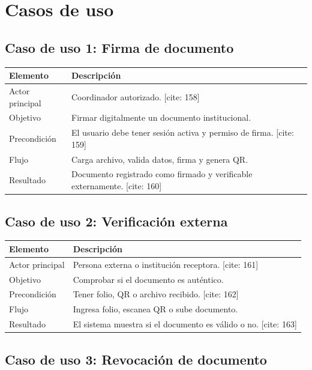\documentclass[10pt]{article} [cite: 1]
\begin{document}
\section{Casos de uso}

\subsection{Caso de uso 1: Firma de documento}

\begin{longtable}{p{4cm}p{10cm}}
\toprule
\textbf{Elemento} & \textbf{Descripción} \\
\midrule
Actor principal & Coordinador autorizado. [cite: 158] \\
Objetivo & Firmar digitalmente un documento institucional. \\
Precondición & El usuario debe tener sesión activa y permiso de firma. [cite: 159] \\
Flujo & Carga archivo, valida datos, firma y genera QR. \\
Resultado & Documento registrado como firmado y verificable externamente. [cite: 160] \\
\bottomrule
\end{longtable}

\subsection{Caso de uso 2: Verificación externa}

\begin{longtable}{p{4cm}p{10cm}}
\toprule
\textbf{Elemento} & \textbf{Descripción} \\
\midrule
Actor principal & Persona externa o institución receptora. [cite: 161] \\
Objetivo & Comprobar si el documento es auténtico. \\
Precondición & Tener folio, QR o archivo recibido. [cite: 162] \\
Flujo & Ingresa folio, escanea QR o sube documento. \\
Resultado & El sistema muestra si el documento es válido o no. [cite: 163] \\
\bottomrule
\end{longtable}

\subsection{Caso de uso 3: Revocación de documento}
\end{document}
